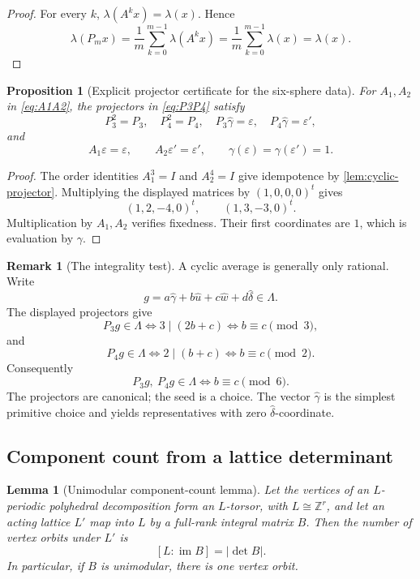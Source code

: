 \documentclass[11pt,reqno]{amsart}
\numberwithin{equation}{section}
\newcommand{\Z}{\mathbb Z}
\newcommand{\im}{\operatorname{im}}
\newcommand{\eps}{\varepsilon}
\newcommand{\epsp}{\varepsilon'}
\newcommand{\wideg}{\widehat\gamma}
\newcommand{\wideu}{\widehat u}
\newcommand{\widew}{\widehat w}
\newcommand{\wided}{\widehat\delta}
\newtheorem{proposition}[proposition]{Proposition}
\newtheorem{lemma}[lemma]{Lemma}
\theoremstyle{definition}
\newtheorem{remark}[remark]{Remark}
\begin{document}
\begin{proof}
For every $k$, $\lambda(A^kx)=\lambda(x)$. Hence
\[
\lambda(P_mx)=\frac1m\sum_{k=0}^{m-1}\lambda(A^kx)
=\frac1m\sum_{k=0}^{m-1}\lambda(x)=\lambda(x).
\]
\end{proof}

\begin{proposition}[Explicit projector certificate for the six-sphere data]\label{prop:projector-certificate}
For $A_1,A_2$ in \cref{eq:A1A2}, the projectors in \cref{eq:P3P4} satisfy
\[
P_3^2=P_3,
\quad
P_4^2=P_4,
\quad
P_3\wideg=\eps,
\quad
P_4\wideg=\epsp,
\]
and
\[
A_1\eps=\eps,
\qquad
A_2\epsp=\epsp,
\qquad
\gamma(\eps)=\gamma(\epsp)=1.
\]
\end{proposition}

\begin{proof}
The order identities $A_1^3=I$ and $A_2^4=I$ give idempotence by \cref{lem:cyclic-projector}. Multiplying the displayed matrices by $(1,0,0,0)^t$ gives
\[
(1,2,-4,0)^t,
\qquad
(1,3,-3,0)^t.
\]
Multiplication by $A_1,A_2$ verifies fixedness. Their first coordinates are $1$, which is evaluation by $\gamma$.
\end{proof}

\begin{remark}[The integrality test]
A cyclic average is generally only rational. Write
\[
g=a\wideg+b\wideu+c\widew+d\wided\in\Lambda.
\]
The displayed projectors give
\[
P_3g\in\Lambda\iff 3\mid(2b+c)\iff b\equiv c\pmod3,
\]
and
\[
P_4g\in\Lambda\iff 2\mid(b+c)\iff b\equiv c\pmod2.
\]
Consequently
\[
\boxed{P_3g,\ P_4g\in\Lambda\iff b\equiv c\pmod6.}
\]
The projectors are canonical; the seed is a choice. The vector $\wideg$ is the simplest primitive choice and yields representatives with zero $\wided$-coordinate.
\end{remark}

\subsection{Component count from a lattice determinant}

\begin{lemma}[Unimodular component-count lemma]\label{lem:component-index}
Let the vertices of an $L$-periodic polyhedral decomposition form an $L$-torsor, with $L\cong\Z^r$, and let an acting lattice $L'$ map into $L$ by a full-rank integral matrix $B$. Then the number of vertex orbits under $L'$ is
\[
[L:\im B]=|\det B|.
\]
In particular, if $B$ is unimodular, there is one vertex orbit.
\end{lemma}
\end{document}
